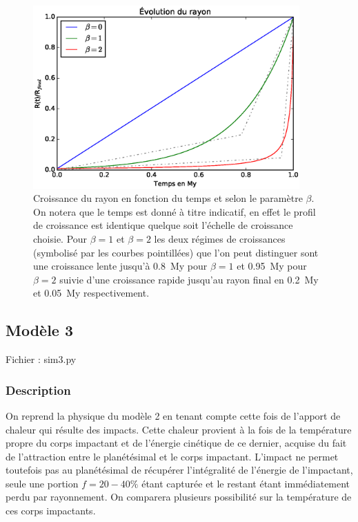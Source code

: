 \documentclass[10pt,a4paper]{article}
\numberwithin{equation}{section}
\begin{document}
\begin{figure}[h!]
\centering
\includegraphics[height=7cm]{./figures/graph_sim2_fig2_3.eps}
\caption{Croissance du rayon en fonction du temps et selon le paramètre $\beta$. On notera que le temps est donné à titre indicatif, en effet le profil de croissance est identique quelque soit l'échelle de croissance choisie. Pour $\beta=1$ et $\beta=2$ les deux régimes de croissances (symbolisé par les courbes pointillées) que l'on peut distinguer sont une croissance lente jusqu'à \SI{0.8}{My} pour $\beta=1$  et \SI{0.95}{My} pour $\beta=2$ suivie d'une croissance rapide jusqu'au rayon final en \SI{0.2}{My} et \SI{0.05}{My} respectivement.}
\label{fig2_3}
\end{figure}


\subsection{Modèle 3}

Fichier : sim3.py

\subsubsection{Description}

On reprend la physique du modèle 2 en tenant compte cette fois de l'apport de chaleur qui résulte des impacts. Cette chaleur provient à la fois de la température propre du corps impactant et de l'énergie cinétique de ce dernier, acquise du fait de l'attraction entre le planétésimal et le corps impactant. L'impact ne permet toutefois pas au planétésimal de récupérer l'intégralité de l'énergie de l'impactant, seule une portion $f=20-40\%$ étant capturée et le restant étant immédiatement perdu par rayonnement. On comparera plusieurs possibilité sur la température de ces corps impactants.
\end{document}
